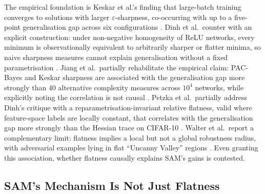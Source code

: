 The empirical foundation is Keskar et al.'s finding that large-batch training converges to solutions with larger $\varepsilon$-sharpness, co-occurring with up to a five-point generalisation gap across six configurations \cite{keskar2016_large_batch}.
Dinh et al.\ counter with an explicit construction: under non-negative homogeneity of ReLU networks, every minimum is observationally equivalent to arbitrarily sharper or flatter minima, so naive sharpness measures cannot explain generalisation without a fixed parametrisation \cite{dinh2017_sharp_minima}.
Jiang et al.\ partially rehabilitate the empirical claim: PAC-Bayes and Keskar sharpness are associated with the generalisation gap more strongly than 40 alternative complexity measures across $10^4$ networks, while explicitly noting the correlation is not causal \cite{jiang2019_fantastic_generalization}.
Petzka et al.\ partially address Dinh's critique with a reparametrisation-invariant relative flatness, valid where feature-space labels are locally constant, that correlates with the generalisation gap more strongly than the Hessian trace on CIFAR-10 \cite{petzka2020_relative_flatness}.
Walter et al.\ report a complementary limit: flatness implies a local but not a global robustness radius, with adversarial examples lying in flat ``Uncanny Valley'' regions \cite{walter2025_when_flatness}.
Even granting this association, whether flatness causally explains SAM's gains is contested.

\subsection{SAM's Mechanism Is Not Just Flatness}

